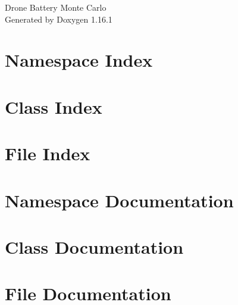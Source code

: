 \documentclass[twoside]{book}
\newcommand{\+}{\discretionary{\mbox{\scriptsize$\hookleftarrow$}}{}{}}
\newcommand{\clearemptydoublepage}{%
    \newpage{\pagestyle{empty}\cleardoublepage}%
  }
\begin{document}
  \raggedbottom
    \hypersetup{pageanchor=false,
                bookmarksnumbered=true,
                pdfencoding=unicode
               }
  \begin{titlepage}
  \vspace*{7cm}
  \begin{center}%
  {\Large Drone Battery Monte Carlo}\\
  \vspace*{1cm}
  {\large Generated by Doxygen 1.16.1}\\
  \end{center}
  \end{titlepage}
  \clearemptydoublepage
  \tableofcontents
  \clearemptydoublepage
  \hypersetup{pageanchor=true}
\chapter{Namespace Index}

\chapter{Class Index}

\chapter{File Index}

\chapter{Namespace Documentation}

\chapter{Class Documentation}



\chapter{File Documentation}

  \backmatter
  \newpage
  \clearemptydoublepage
  \printindex
\end{document}

